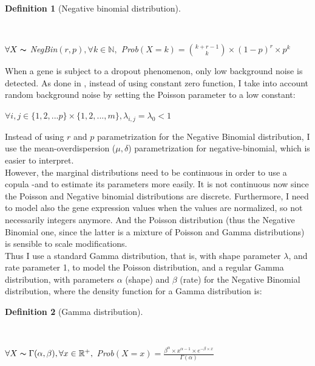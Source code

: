 \documentclass{report}
\newtheorem{definition}{Definition}[section]
\begin{document}
\begin{definition}[Negative binomial distribution]\label{negativebinomial}{~\\\begin{center}$\forall X \thicksim$ \textit{NegBin}$(r, p), \forall k \in \mathbb{N},$ \textit{Prob}$(X = k) = {{k+r-1}\choose{k}} \times (1-p)^r \times p^k$\end{center}}\end{definition}

When a gene is subject to a dropout phenomenon, only low background noise is detected. As done in \cite{kharchenko2014bayesian}, instead of using constant zero function, I take into account random background noise by setting the Poisson parameter to a low constant:

\begin{center}
$\forall i,j \in \{1, 2, ... p\} \times \{1, 2, ..., m\}, \lambda_{i,j} = \lambda_0 < 1$\\
\end{center}

Instead of using $r$ and $p$ parametrization for the Negative Binomial distribution, I use the mean-overdispersion ($\mu, \delta$) parametrization for negative-binomial\cite{rodriguez2013models}, which is easier to interpret.\\

However, the marginal distributions need to be continuous in order to use a copula -and to estimate its parameters more easily. It is not continuous now since the Poisson and Negative binomial distributions are discrete. Furthermore, I need to model also the gene expression values when the values are normalized, so not necessarily integers anymore. And the Poisson distribution (thus the Negative Binomial one, since the latter is a mixture of Poisson and Gamma distributions) is sensible to scale modifications.\\

Thus I use a standard Gamma distribution, that is, with shape parameter $\lambda$, and rate parameter 1, to model the Poisson distribution, and a regular Gamma distribution, with parameters $\alpha$ (shape) and $\beta$ (rate) for the Negative Binomial distribution, where the density function for a Gamma distribution is:

\begin{definition}[Gamma distribution]\label{gamma}{~\\\begin{center}$\forall X \thicksim \Gamma(\alpha, \beta), \forall x \in \mathbb{R}^+,$ \textit{Prob}$(X = x) = \frac{\beta^{\alpha} \times x^{\alpha-1} \times e^{-\beta \times x}}{\Gamma(\alpha)}$\end{center}}\end{definition}
\end{document}
